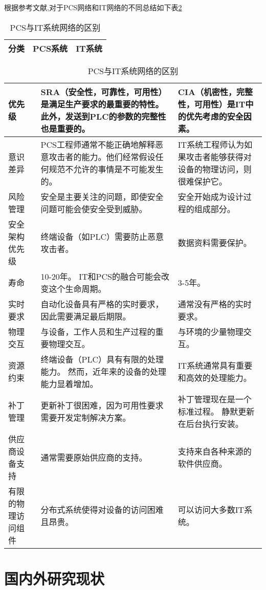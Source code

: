 根据参考文献\parencite{Byres09},对于PCS网络和IT网络的不同总结如下表\ref{intro:diffBetweenPCSandIT}
\newcommand{\tabincell}[2]{\begin{tabular}{@{}#1@{}}#2\end{tabular}}
\begin{table}[!htp]
\centering
\caption{PCS与IT系统网络的区别}
\label{intro:diffBetweenPCSandIT}
\begin{tabular}{|p{2cm}<{\centering}|p{6cm}<{\centering}|p{6cm}<{\centering}|}
\hline
分类 & PCS系统 & IT系统 \\
\hline
\end{tabular}
\begin{tabular}{|p{2cm}|p{6cm}|p{6cm}|}
\hline
优先级 & SRA（安全性，可靠性，可用性）是满足生产要求的最重要的特性。此外，发送到PLC的参数的完整性也是重要的。 & CIA（机密性，完整性，可用性）是IT中的优先考虑的安全因素。 \\
\hline
意识差异 & PCS工程师通常不能正确地解释恶意攻击者的能力。他们经常假设任何规范不允许的事情是不可能发生的。 & IT系统工程师认为如果攻击者能够获得对设备的物理访问，则很难保护它。 \\
\hline
风险管理 & 安全是主要关注的问题，即使安全问题可能会使安全受到威胁。 & 安全开始成为设计过程的组成部分。 \\
\hline
安全架构优先级 & 终端设备（如PLC）需要防止恶意攻击者。 & 数据资料需要保护。 \\
\hline
寿命 & 10-20年。 IT和PCS的融合可能会改变这个生命周期。 & 3-5年。 \\
\hline
实时要求 & 自动化设备具有严格的实时要求，因此需要满足最后期限。 & 通常没有严格的实时要求。 \\
\hline
物理交互 & 与设备，工作人员和生产过程的重要物理交互。 & 与环境的少量物理交互。 \\
\hline
资源约束 & 终端设备（PLC）具有有限的处理能力。 然而，近年来的设备的处理能力显着增加。 & IT系统通常具有重要和高效的处理能力。 \\
\hline
补丁管理 & 更新补丁很困难，因为可用性要求 需要开发定制解决方案。 & 补丁管理现在是一个标准过程。 静默更新在后台执行安装。 \\
\hline
供应商设备支持 & 通常需要原始供应商的支持。 & 支持来自各种来源的软件供应商。 \\
\hline
有限的物理访问组件 & 分布式系统使得对设备的访问困难且昂贵。 & 可以访问大多数IT系统。\\
\hline
\end{tabular}
\end{table}


\section{国内外研究现状}

